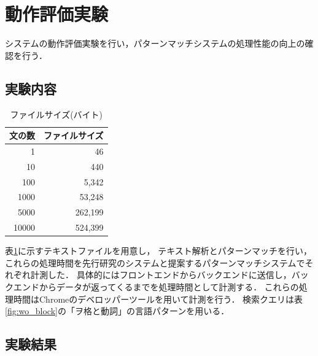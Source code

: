 \documentclass{FITpaper}
\begin{document}
\section{動作評価実験}
システムの動作評価実験を行い，パターンマッチシステムの処理性能の向上の確認を行う．

\subsection{実験内容}
\begin{table}[htbp]
  \centering
    \caption{ファイルサイズ(バイト)}
    \label{tbl:txt}
    \begin{tabular}{|r||r|}  
      \hline
      文の数 & ファイルサイズ\\ \hline \hline
      1 & 46\\\hline
      10 & 440 \\\hline
      100 & 5,342\\ \hline
      1000 & 53,248 \\\hline
      5000 &  262,199 \\\hline
      10000 &  524,399\\ \hline
    \end{tabular}
  \end{table}

表\ref{tbl:txt}に示すテキストファイルを用意し，
テキスト解析とパターンマッチを行い，これらの処理時間を先行研究のシステムと提案するパターンマッチシステムでそれぞれ計測した．
具体的にはフロントエンドからバックエンドに送信し，バックエンドからデータが返ってくるまでを処理時間として計測する．
これらの処理時間はChromeのデベロッパーツールを用いて計測を行う．
検索クエリは表\ref{fig:wo_block}の「ヲ格と動詞」の言語パターンを用いる．


\subsection{実験結果}
\end{document}
